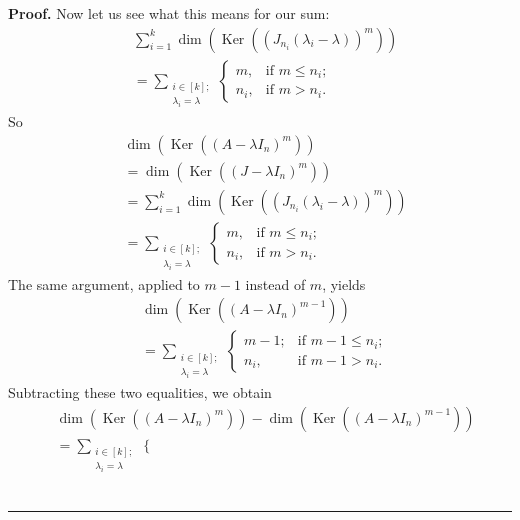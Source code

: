 \documentclass[numbers=enddot,12pt,final,onecolumn,notitlepage]{scrartcl}%
\numberwithin{exer}{subsection}
\theoremstyle{definition}
\newenvironment{proof}[1][Proof]{\noindent\textbf{#1.} }{\ \rule{0.5em}{0.5em}}
\let\sumnonlimits\sum
\renewcommand{\sum}{\sumnonlimits\limits}
\begin{document}
\begin{proof}
Now let us see what this means for our sum:%
\begin{align*}
& \sum_{i=1}^{k}\dim\left(  \operatorname*{Ker}\left(  \left(  J_{n_{i}%
}\left(  \lambda_{i}-\lambda\right)  \right)  ^{m}\right)  \right)  \\
& =\sum_{\substack{i\in\left[  k\right]  ;\\\lambda_{i}=\lambda}}%
\begin{cases}
m, & \text{if }m\leq n_{i};\\
n_{i}, & \text{if }m>n_{i}.
\end{cases}
\end{align*}
So%
\begin{align*}
& \dim\left(  \operatorname*{Ker}\left(  \left(  A-\lambda I_{n}\right)
^{m}\right)  \right)  \\
& =\dim\left(  \operatorname*{Ker}\left(  \left(  J-\lambda I_{n}\right)
^{m}\right)  \right)  \\
& =\sum_{i=1}^{k}\dim\left(  \operatorname*{Ker}\left(  \left(  J_{n_{i}%
}\left(  \lambda_{i}-\lambda\right)  \right)  ^{m}\right)  \right)  \\
& =\sum_{\substack{i\in\left[  k\right]  ;\\\lambda_{i}=\lambda}}%
\begin{cases}
m, & \text{if }m\leq n_{i};\\
n_{i}, & \text{if }m>n_{i}.
\end{cases}
\end{align*}
The same argument, applied to $m-1$ instead of $m$, yields%
\begin{align*}
& \dim\left(  \operatorname*{Ker}\left(  \left(  A-\lambda I_{n}\right)
^{m-1}\right)  \right)  \\
& =\sum_{\substack{i\in\left[  k\right]  ;\\\lambda_{i}=\lambda}}%
\begin{cases}
m-1; & \text{if }m-1\leq n_{i};\\
n_{i}, & \text{if }m-1>n_{i}.
\end{cases}
\end{align*}
Subtracting these two equalities, we obtain%
\begin{align*}
& \dim\left(  \operatorname*{Ker}\left(  \left(  A-\lambda I_{n}\right)
^{m}\right)  \right)  -\dim\left(  \operatorname*{Ker}\left(  \left(
A-\lambda I_{n}\right)  ^{m-1}\right)  \right)  \\
& =\sum_{\substack{i\in\left[  k\right]  ;\\\lambda_{i}=\lambda}}%
\begin{cases}

\end{cases}
\end{align*}
\end{proof}
\end{document}
